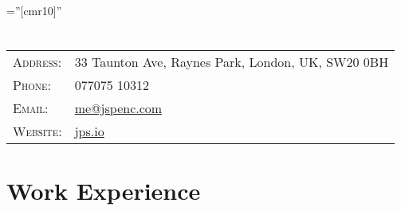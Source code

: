 \documentclass[a4paper,10pt]{article} %
\begin{document}
\pagestyle{empty} %

\font\fb=''[cmr10]'' %


\par{\bigskip\par} %

\section{}

\begin{tabular}{L{2cm}l}
\textsc{Address:} & 33 Taunton Ave, Raynes Park, London, UK, SW20 0BH\\
\textsc{Phone:} & 077075 10312\\
\textsc{Email:} & \href{mailto:me@jspenc.com}{me@jspenc.com}\\
\textsc{Website:} & \href{http://jps.io}{jps.io} \\
\end{tabular}







\section{Work Experience}
\end{document}
